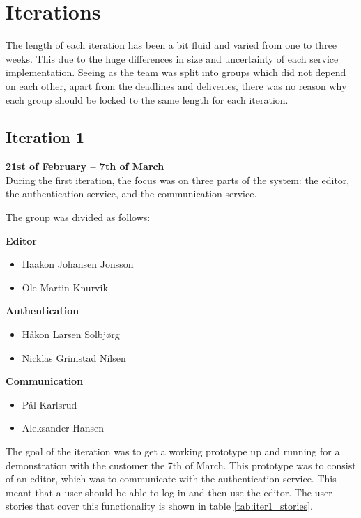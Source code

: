 \section{Iterations}
The length of each iteration has been a bit fluid and varied from one to three weeks. This due to the huge differences in size and uncertainty of each service implementation. Seeing as the team was split into groups which did not depend on each other, apart from the deadlines and deliveries, there was no reason why each group should be locked to the same length for each iteration. 

\subsection{Iteration 1}
\textbf{21st of February -- 7th of March} \\
\noindent During the first iteration, the focus was on three parts of the system: the editor, the authentication service, and the communication service.

The group was divided as follows:

\begin{flushleft}
\textbf{Editor}
\begin{itemize}
\itemsep -0.5em
  \item Haakon Johansen Jonsson
  \item Ole Martin Knurvik
\end{itemize}

\textbf{Authentication}
\begin{itemize}
\itemsep -0.5em
  \item Håkon Larsen Solbjørg
  \item Nicklas Grimstad Nilsen
\end{itemize}


\textbf{Communication}
\begin{itemize}
\itemsep -0.5em
  \item Pål Karlsrud
  \item Aleksander Hansen
\end{itemize}

\end{flushleft}

The goal of the iteration was to get a working prototype up and running for a demonstration with the customer the 7th of March.
This prototype was to consist of an editor, which was to communicate with the authentication service. This meant that a user should be able to log in and then use the editor. The user stories that cover this functionality is shown in table \ref{tab:iter1_stories}.

